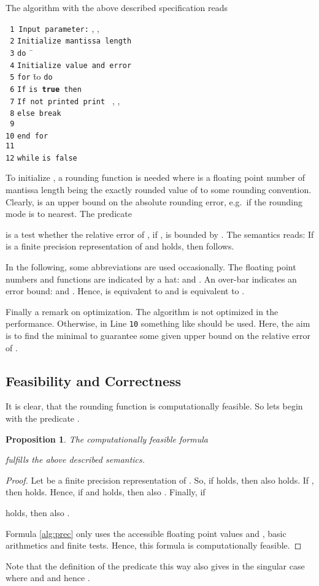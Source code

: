 \documentclass[copyright,creativecommons]{eptcs}
\newtheorem{proposition}{Proposition}[section]
\theoremstyle{definition}
\begin{document}
The algorithm with the above described specification reads
\begin{tabbing}
{\tt\ 1}\ \= {\tt Input parameter:} , , \\
{\tt\ 2}\> {\tt Initialize mantissa length} \\
{\tt\ 3}\> {\tt do} \= \ \\
{\tt\ 4}\> \> {\tt Initialize value and error} \\
{\tt\ 5}\> \> {\tt for} \=  to  {\tt do}\\
{\tt\ 6}\> \> \> {\tt If} \=  {\tt is {\bf true} then}\\
{\tt\ 7}\> \> \> \> {\tt If not printed print } , ,  \\
{\tt\ 8}\> \> \> {\tt else break}\\
{\tt\ 9}\> \> \> \\
{\tt 10}\> \> {\tt end for}\\
{\tt 11}\> \> \\
{\tt 12}\> {\tt while}  {\tt is false}
\end{tabbing}
To initialize , a rounding function
 is needed where 
is a floating point number of mantissa length  being
the exactly rounded value of  to some rounding convention.
Clearly,  is an upper bound on the absolute
rounding error, e.g.\  if
the rounding mode is to nearest. The predicate

is a test whether the relative error of ,
 if , is bounded by . The
semantics reads: If  is a finite precision
representation of  and 
holds, then  follows.

In the following, some abbreviations are used occasionally.
The floating point numbers and functions are indicated by a
hat: 
and . An over-bar indicates an error bound:
 and . Hence,
 is equivalent to  and 
is equivalent to .

Finally a remark on optimization. The algorithm
is not optimized in the performance. Otherwise, in Line {\tt 10}
something like  should be used. Here, the aim is to
find the minimal  to guarantee some given upper bound on the
relative error of .


\subsection{Feasibility and Correctness}
It is clear, that the rounding function  is computationally
feasible. So lets begin with the predicate .
\begin{proposition}
The computationally feasible formula

fulfills the above described semantics.
\end{proposition}
\begin{proof}
Let  be a finite precision
representation of . So, if 
holds, then also  holds.
If , then
 holds. Hence, if
 and
 holds,
then also . Finally, if

holds, then also
.

Formula \ref{alg:prec} only uses the accessible floating point
values  and , basic arithmetics and
finite tests. Hence, this formula is computationally feasible.
\end{proof}
Note that the definition of the predicate this way
also gives  in the singular case where 
and  and hence .
\end{document}
